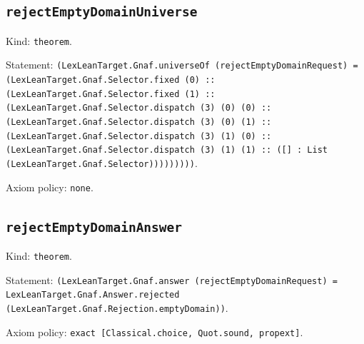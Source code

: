 \documentclass[11pt]{article}
\begin{document}
\subsection*{\texttt{rejectEmptyDomainUniverse}}
\noindent Kind: \texttt{theorem}.\par
\noindent Statement: \texttt{(LexLeanTarget.Gnaf.universeOf (rejectEmptyDomainRequest) = (LexLeanTarget.Gnaf.Selector.fixed (0) :: (LexLeanTarget.Gnaf.Selector.fixed (1) :: (LexLeanTarget.Gnaf.Selector.dispatch (3) (0) (0) :: (LexLeanTarget.Gnaf.Selector.dispatch (3) (0) (1) :: (LexLeanTarget.Gnaf.Selector.dispatch (3) (1) (0) :: (LexLeanTarget.Gnaf.Selector.dispatch (3) (1) (1) :: ([] : List (LexLeanTarget.Gnaf.Selector)))))))))}.\par
\noindent Axiom policy: \texttt{none}.\par
\subsection*{\texttt{rejectEmptyDomainAnswer}}
\noindent Kind: \texttt{theorem}.\par
\noindent Statement: \texttt{(LexLeanTarget.Gnaf.answer (rejectEmptyDomainRequest) = LexLeanTarget.Gnaf.Answer.rejected (LexLeanTarget.Gnaf.Rejection.emptyDomain))}.\par
\noindent Axiom policy: \texttt{exact [Classical.choice, Quot.sound, propext]}.\par
\end{document}
